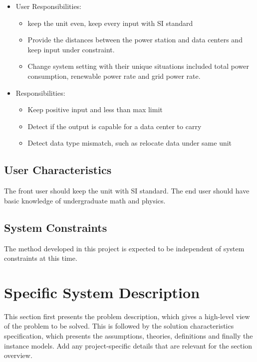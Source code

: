 \documentclass[12pt]{article}
\begin{document}
\begin{itemize}
\item User Responsibilities:
\begin{itemize}
\item keep the unit even, keep every input with SI standard
\item Provide the distances between the power station and data centers and keep input under constraint.
\item Change system setting with their unique situations included total power consumption, renewable power rate and grid power rate.

\end{itemize}
\item {} Responsibilities:
\begin{itemize}
\item Keep positive input and less than max limit
\item Detect if the output is capable for a data center to carry
\item Detect data type mismatch, such as relocate data under same unit
\end{itemize}
\end{itemize}

\subsection{User Characteristics} \label{SecUserCharacteristics}

{The front user should keep the unit with SI standard. The end user should have basic knowledge of undergraduate math and physics.}

\subsection{System Constraints}

{The method developed in this project is expected to be independent of system constraints at this time.}

\section{Specific System Description}

This section first presents the problem description, which gives a high-level
view of the problem to be solved.  This is followed by the solution characteristics
specification, which presents the assumptions, theories, definitions and finally
the instance models.  {Add any project-specific details that are relevant
  for the section overview.}
\end{document}
